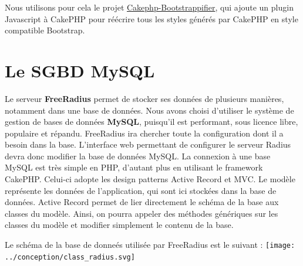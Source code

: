 \documentclass[10pt]{article}
\begin{document}
Nous utilisons pour cela le projet \href{https://github.com/mtkocak/Cakephp-Bootstrappifier}{Cakephp-Bootstrappifier}, qui ajoute un plugin Javascript à CakePHP pour réécrire tous les styles générés par CakePHP en style compatible Bootstrap.


\newpage
\section{Le SGBD MySQL}

Le serveur \textbf{FreeRadius} permet de stocker ses données de plusieurs manières, notamment dans une base de données. Nous avons choisi d'utiliser le système de gestion de bases de données \textbf{MySQL}, puisqu'il est performant, sous licence libre, populaire et répandu. FreeRadius ira chercher toute la configuration dont il a besoin dans la base. L'interface web permettant de configurer le serveur Radius devra donc modifier la base de données MySQL.
La connexion à une base MySQL est très simple en PHP, d'autant plus en utilisant le framework CakePHP. Celui-ci adopte les design patterns Active Record et MVC. Le modèle représente les données de l'application, qui sont ici stockées dans la base de données. Active Record permet de lier directement le schéma de la base aux classes du modèle. Ainsi, on pourra appeler des méthodes génériques sur les classes du modèle et modifier simplement le contenu de la base.


Le schéma de la base de donneés utilisée par FreeRadius est le suivant :
\texttt{[image: ../conception/class\_radius.svg]}
\end{document}
